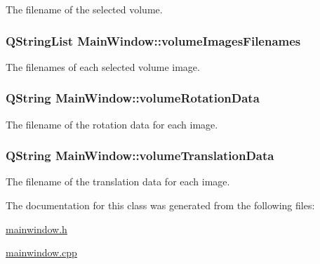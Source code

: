 The filename of the selected volume. 

\hypertarget{class_main_window_a1a88d2961b59b38eb58bffeb1a6ffe39}{
\subsubsection[{volume\-Images\-Filenames}]{\setlength{\rightskip}{0pt plus 5cm}Q\-String\-List {\bf Main\-Window\-::volume\-Images\-Filenames}}}\label{d9/dc6/class_main_window_a1a88d2961b59b38eb58bffeb1a6ffe39}


The filenames of each selected volume image. 

\hypertarget{class_main_window_ad2139711b6f91f541304b5dc5cf311ac}{
\subsubsection[{volume\-Rotation\-Data}]{\setlength{\rightskip}{0pt plus 5cm}Q\-String {\bf Main\-Window\-::volume\-Rotation\-Data}}}\label{d9/dc6/class_main_window_ad2139711b6f91f541304b5dc5cf311ac}


The filename of the rotation data for each image. 

\hypertarget{class_main_window_aec94bc06393ad4a2fc014d71fbeddbd3}{
\subsubsection[{volume\-Translation\-Data}]{\setlength{\rightskip}{0pt plus 5cm}Q\-String {\bf Main\-Window\-::volume\-Translation\-Data}}}\label{d9/dc6/class_main_window_aec94bc06393ad4a2fc014d71fbeddbd3}


The filename of the translation data for each image. 



The documentation for this class was generated from the following files\-:\begin{DoxyCompactItemize}
\item 
\hyperlink{mainwindow_8h}{mainwindow.\-h}\item 
\hyperlink{mainwindow_8cpp}{mainwindow.\-cpp}\end{DoxyCompactItemize}
